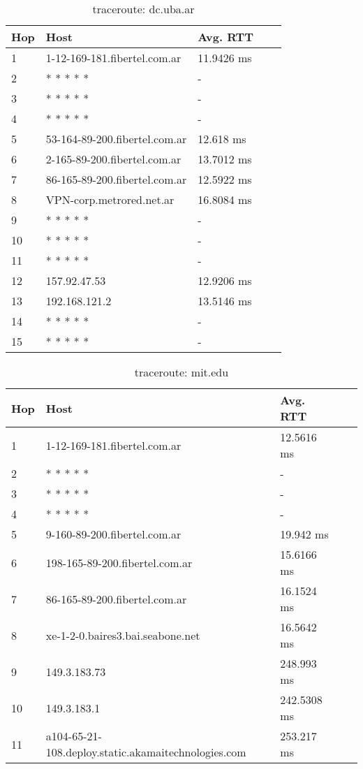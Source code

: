 \begin{table}[H]
\centering
\begin{tabular}{@{}lllll@{}}
\toprule
Hop & Host & Avg. RTT \\ \midrule
1 & 1-12-169-181.fibertel.com.ar & 11.9426 ms\\
2 &  * * * * * & - \\
3 &  * * * * * & - \\
4 &  * * * * * & - \\
5 & 53-164-89-200.fibertel.com.ar & 12.618 ms\\
6 & 2-165-89-200.fibertel.com.ar & 13.7012 ms\\
7 & 86-165-89-200.fibertel.com.ar & 12.5922 ms\\
8 & VPN-corp.metrored.net.ar & 16.8084 ms\\
9 &  * * * * * & - \\
10 &  * * * * * & - \\
11 &  * * * * * & - \\
12 & 157.92.47.53 & 12.9206 ms\\
13 & 192.168.121.2 & 13.5146 ms\\
14 &  * * * * * & - \\
15 &  * * * * * & - \\
 \bottomrule
\end{tabular}
\caption{traceroute: dc.uba.ar}
\label{google}
\end{table}

\begin{table}[H]
\centering
\begin{tabular}{@{}lllll@{}}
\toprule
Hop & Host & Avg. RTT \\ \midrule
1 & 1-12-169-181.fibertel.com.ar & 12.5616 ms\\
2 &  * * * * * & - \\
3 &  * * * * * & - \\
4 &  * * * * * & - \\
5 & 9-160-89-200.fibertel.com.ar & 19.942 ms\\
6 & 198-165-89-200.fibertel.com.ar & 15.6166 ms\\
7 & 86-165-89-200.fibertel.com.ar & 16.1524 ms\\
8 & xe-1-2-0.baires3.bai.seabone.net & 16.5642 ms\\
9 & 149.3.183.73 & 248.993 ms\\
10 & 149.3.183.1 & 242.5308 ms\\
11 & a104-65-21-108.deploy.static.akamaitechnologies.com & 253.217 ms\\ \bottomrule
\end{tabular}
\caption{traceroute: mit.edu}
\label{mit}
\end{table}

